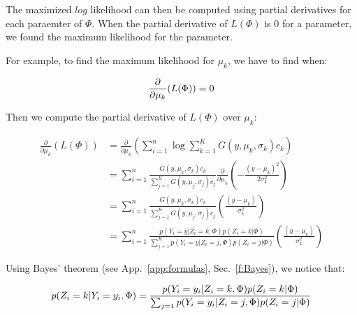 The maximized $log$ likelihood can then be computed using partial derivatives for each paraemter of $\Phi$. When the partial derivative of $L(\Phi)$ is $0$ for a parameter, we found the maximum likelihood for the parameter.
\par
For example, to find the maximum likelihood for $\mu_k$, we have to find when:

  \begin{equation*}\label{PD}
  \frac{\partial}{\partial\mu_k}(L(\Phi))=0\\
  \end{equation*}

\par
Then we compute the partial derivative of $L(\Phi)$ over $\mu_k$:

  \begin{align}\label{partialDerivative}
  \frac{\partial}{\partial\mu_k}(L(\Phi)) &= \frac{\partial}{\partial\mu_k}( \sum_{i=1}^n \operatorname*{log} \sum_{k=1}^K G(y,\mu_k,\sigma_k)c_k\nonumber)  \\
                                          &= \sum_{i=1}^n \frac{G(y,\mu_k,\sigma_k)c_k}{\sum_{j=1}^K G(y,\mu_j,\sigma_j)c_j}\frac{\partial}{\partial\mu_k}  (-\frac{(y-\mu_k)^2}{2\sigma_k^2}) \nonumber \\
                                          &= \sum_{i=1}^n \frac{G(y,\mu_k,\sigma_k)c_k}{\sum_{j=1}^K G(y,\mu_j,\sigma_j)c_j}(\frac{(y-\mu_k)}{\sigma_k^2}) \nonumber \\
                                          &= \sum_{i=1}^n \frac{p(Y_i=y|Z_i=k,\Phi)p(Z_i=k|\Phi)}{\sum_{j=1}^K p(Y_i=y|Z_i=j,\Phi)p(Z_i=j|\Phi)}(\frac{(y-\mu_k)} {\sigma_k^2})
  \end{align}

Using Bayes' theorem (see App.~\ref{app:formulas}, Sec.~\ref{f:Bayes}), we notice that:

  \begin{equation}\label{BF}
  p(Z_i=k|Y_i=y_i,\Phi)= \frac{p(Y_i=y_i|Z_i=k,\Phi)p(Z_i=k|\Phi)}{\sum_{j=1} p(Y_i=y_i|Z_i=j,\Phi)p(Z_i=j|\Phi)}\\
  \end{equation}

